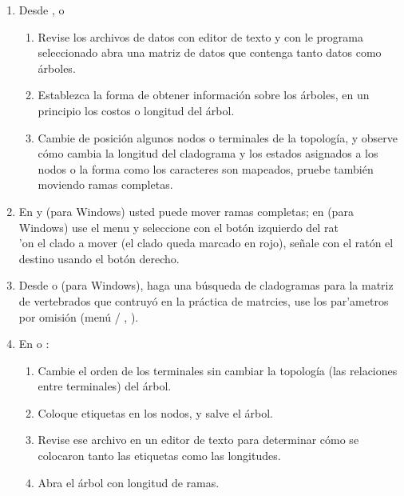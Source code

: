 \begin{enumerate}

	\item Desde ,  o 
	\begin{enumerate}

		\item Revise los archivos de datos con editor de texto y con le programa seleccionado abra una matriz de datos que contenga tanto datos como \'arboles.

		\item Establezca la forma de obtener informaci\'on sobre los \'arboles, en un principio los costos o longitud del \'arbol.

		\item Cambie de posici\'on algunos nodos o terminales de la topolog\'ia, y observe c\'omo cambia la longitud del cladograma y los estados asignados a los nodos o la forma como los caracteres son mapeados, pruebe tambi\'en moviendo ramas completas.

	\end{enumerate}

	\item En  y  (para Windows) usted puede mover ramas completas; en  (para Windows) use el menu  y seleccione con el bot\'on izquierdo del rat\\'on el clado a mover (el clado queda marcado en rojo), se\~nale con el rat\'on el destino usando el bot\'on derecho.

	\item Desde  o  (para Windows), haga una b\'usqueda de cladogramas para la matriz de vertebrados que contruy\'o en la pr\'actica de matrcies, use los par'ametros por omisi\'on (men\'u  / , ).

	\item En  o :
	\begin{enumerate}
		\item Cambie el orden de los terminales sin cambiar la topolog\'ia (las relaciones entre terminales) del \'arbol.
		\item Coloque etiquetas en los nodos, y salve el \'arbol.
		\item Revise ese archivo en un editor de texto para determinar c\'omo se colocaron tanto las etiquetas como las longitudes.
		\item Abra el \'arbol con longitud de ramas.
	\end{enumerate}



\end{enumerate}

